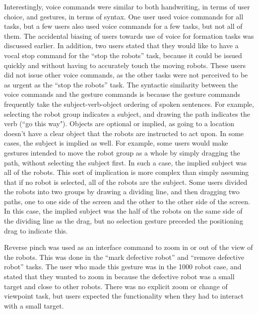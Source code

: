 Interestingly, voice commands were similar to both handwriting, in terms of user choice, and gestures, in terms of syntax. 
One user used voice commands for all tasks, but a few users also used voice commands for a few tasks, but not all of them. 
The accidental biasing of users towards use of voice for formation tasks was discussed earlier. 
In addition, two users stated that they would like to have a vocal stop command for the ``stop the robots'' task, because it could be issued quickly and without having to accurately touch the moving robots. 
These users did not issue other voice commands, as the other tasks were not perceived to be as urgent as the ``stop the robots'' task. 
The syntactic similarity between the voice commands and the gesture commands is because the gesture commands frequently take the subject-verb-object ordering of spoken sentences. 
For example, selecting the robot group indicates a subject, and drawing the path indicates the verb (``go this way"). 
Objects are optional or implied, as going to a location doesn't have a clear object that the robots are instructed to act upon. 
In some cases, the subject is implied as well.
For example, some users would make gestures intended to move the robot group as a whole by simply dragging the path, without selecting the subject first. 
In such a case, the implied subject was all of the robots. 
This sort of implication is more complex than simply assuming that if no robot is selected, all of the robots are the subject. 
Some users divided the robots into two groups by drawing a dividing line, and then dragging two paths, one to one side of the screen and the other to the other side of the screen. 
In this case, the implied subject was the half of the robots on the same side of the dividing line as the drag, but no selection gesture preceded the positioning drag to indicate this. 


Reverse pinch was used as an interface command to zoom in or out of the view of the robots. This was done in the ``mark defective robot'' and ``remove defective robot'' tasks. 
The user who made this gesture was in the 1000 robot case, and stated that they wanted to zoom in because the defective robot was a small target and close to other robots. 
There was no explicit zoom or change of viewpoint task, but users expected the functionality when they had to interact with a small target.

